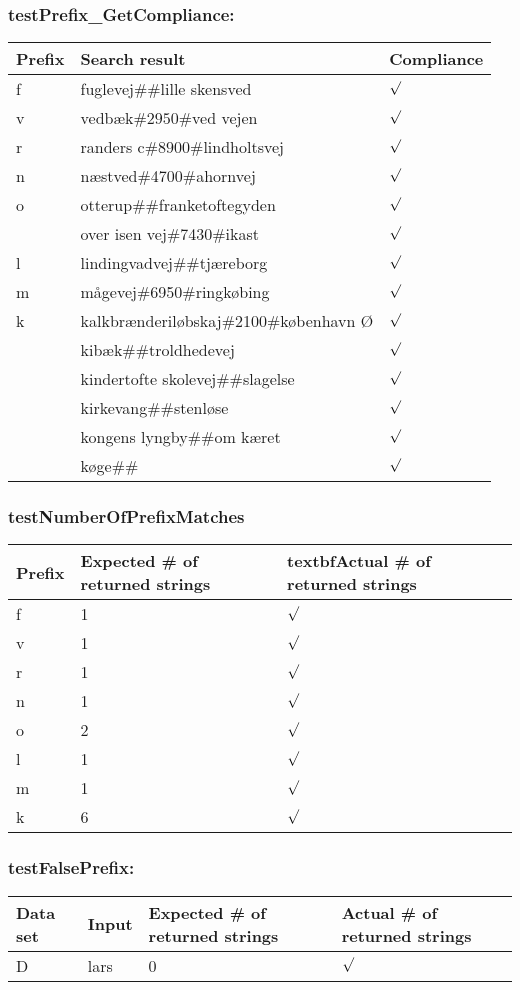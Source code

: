\subsubsection*{testPrefix\_GetCompliance:}
\begin{tabular}{ p{1cm} | p{8cm} | p{1cm} }
	\textbf{Prefix} & \textbf{Search result} & \textbf{\textbf{Compliance}} \\
	\hline
	f & fuglevej$\#\#$lille skensved & $\surd$ \\
	v & vedb\ae k$\#2950\#$ved vejen & $\surd$ \\
	r & randers c$\#8900\#$lindholtsvej & $\surd$ \\
	n & n\ae stved$\#$4700$\#$ahornvej & $\surd$ \\
	o & otterup$\#\#$franketoftegyden & $\surd$ \\
	  & over isen vej$\#$7430$\#$ikast & $\surd$ \\
	l & lindingvadvej$\#\#$tj\ae reborg & $\surd$ \\
	m & m\aa gevej$\#$6950$\#$ringk\o bing & $\surd$ \\
	k & kalkbr\ae nderil\o bskaj$\#$2100$\#$k\o benhavn \O & $\surd$ \\
	  & kib\ae k$\#\#$troldhedevej & $\surd$ \\
	  & kindertofte skolevej$\#\#$slagelse & $\surd$ \\
	  & kirkevang$\#\#$stenl\o se & $\surd$ \\
	  & kongens lyngby$\#\#$om k\ae ret & $\surd$ \\
	  & k\o ge$\#\#$ & $\surd$ \\
\end{tabular}

\subsubsection*{testNumberOfPrefixMatches}
\begin{tabular}{ p{1cm} | p{2cm} | p{2cm} }
	\textbf{Prefix} & \textbf{Expected \# of returned strings} & textbf{Actual \# of returned strings} \\
	\hline
	f & 1 & $\surd$ \\
	v & 1 & $\surd$ \\
	r & 1 & $\surd$ \\
	n & 1 & $\surd$ \\
	o & 2 & $\surd$ \\
    l & 1 & $\surd$ \\
    m & 1 & $\surd$ \\
    k & 6 & $\surd$ \\
\end{tabular}

\subsubsection*{testFalsePrefix:}
\begin{tabular}{ p{1.5cm} | p{8cm} | p{2cm} | p{1cm} }
	\textbf{Data set} & \textbf{Input} & \textbf{Expected  \# of returned strings} & \textbf{Actual \# of returned strings} \\	
	\hline
	D & lars & 0 & $\surd$
\end{tabular}